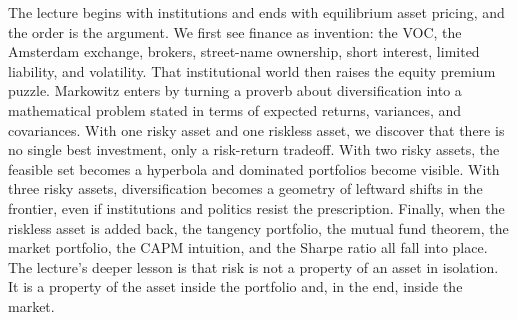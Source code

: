 The lecture begins with institutions and ends with equilibrium asset pricing, and the order is the argument. We first see finance as invention: the VOC, the Amsterdam exchange, brokers, street-name ownership, short interest, limited liability, and volatility. That institutional world then raises the equity premium puzzle. Markowitz enters by turning a proverb about diversification into a mathematical problem stated in terms of expected returns, variances, and covariances. With one risky asset and one riskless asset, we discover that there is no single best investment, only a risk-return tradeoff. With two risky assets, the feasible set becomes a hyperbola and dominated portfolios become visible. With three risky assets, diversification becomes a geometry of leftward shifts in the frontier, even if institutions and politics resist the prescription. Finally, when the riskless asset is added back, the tangency portfolio, the mutual fund theorem, the market portfolio, the CAPM intuition, and the Sharpe ratio all fall into place. The lecture's deeper lesson is that risk is not a property of an asset in isolation. It is a property of the asset inside the portfolio and, in the end, inside the market.
